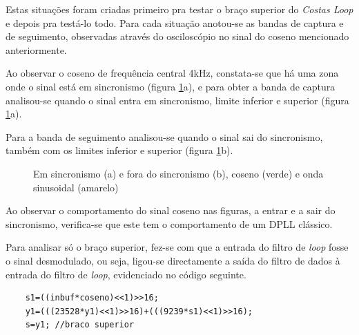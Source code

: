 \documentclass[11pt]{article}
\numberwithin{equation}{section}
\begin{document}
	Estas situações foram criadas primeiro pra testar o braço superior do \textit{Costas Loop} e depois pra testá-lo todo. Para cada situação anotou-se as bandas de captura e de seguimento, observadas através do osciloscópio no sinal do coseno mencionado anteriormente. 
	
	Ao observar o coseno de frequência central 4kHz, constata-se que há uma zona onde o sinal está em sincronismo (figura \ref{cap_segue}a), e para obter a banda de captura analisou-se quando o sinal entra em sincronismo, limite inferior e superior (figura \ref{cap_segue}a).
	
	Para a banda de seguimento analisou-se quando o sinal sai do sincronismo, também com os limites inferior e superior (figura \ref{cap_segue}b).
	\begin{figure}[h]
		\centering
		\hspace{6 mm}
		\caption{Em sincronismo (a) e fora do sincronismo (b), coseno (verde) e onda sinusoidal (amarelo)}
		\label{cap_segue}
	\end{figure}
	
	Ao observar o comportamento do sinal coseno nas figuras, a entrar e a sair do sincronismo, verifica-se que este tem o comportamento de um DPLL clássico.
	
	Para analisar só o braço superior, fez-se com que a entrada do filtro de \textit{loop} fosse o sinal desmodulado, ou seja, ligou-se directamente a saída do filtro de dados à entrada do filtro de \textit{loop}, evidenciado no código seguinte.
	\begin{lstlisting}
	s1=((inbuf*coseno)<<1)>>16;
	y1=(((23528*y1)<<1)>>16)+(((9239*s1)<<1)>>16);
	s=y1; //braco superior
	\end{lstlisting}
	
\end{document}
